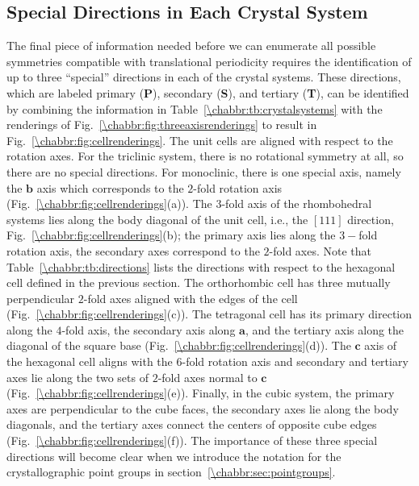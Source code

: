 \subsection{Special Directions in Each Crystal System}\label{\chabbr:ssec:specdir}

The final piece of information needed before we can enumerate all possible symmetries compatible with translational periodicity requires the identification of up to three ``special'' directions in each of the crystal systems.  These directions, which are labeled primary (\textbf{P}), secondary (\textbf{S}), and tertiary (\textbf{T}), can be identified by combining the information in Table~\ref{\chabbr:tb:crystalsystems} with the renderings of Fig.~\ref{\chabbr:fig:threeaxisrenderings} to result in Fig.~\ref{\chabbr:fig:cellrenderings}.  The unit cells are aligned with respect to the rotation axes. For the triclinic system, there is no rotational symmetry at all, so there are no special directions.  For monoclinic, there is one special axis, namely the $\mathbf{b}$ axis which corresponds to the $2$-fold rotation axis (Fig.~\ref{\chabbr:fig:cellrenderings}(a)).  The $3$-fold axis of the rhombohedral systems lies along the body diagonal of the unit cell, i.e., the $[111]$ direction, Fig.~\ref{\chabbr:fig:cellrenderings}(b); the primary axis lies along the $3-$fold rotation axis, the secondary axes correspond to the $2$-fold axes. Note that Table~\ref{\chabbr:tb:directions} lists the directions with respect to the hexagonal cell defined in the previous section. The orthorhombic cell has three mutually perpendicular $2$-fold axes aligned with the edges of the cell (Fig.~\ref{\chabbr:fig:cellrenderings}(c)). The tetragonal cell has its primary direction along the $4$-fold axis, the secondary axis along $\mathbf{a}$, and the tertiary axis along the diagonal of the square base (Fig.~\ref{\chabbr:fig:cellrenderings}(d)). The $\mathbf{c}$ axis of the hexagonal cell aligns with the $6$-fold rotation axis and secondary and tertiary axes lie along the two sets of $2$-fold axes normal to $\mathbf{c}$ (Fig.~\ref{\chabbr:fig:cellrenderings}(e)). Finally, in the cubic system, the primary axes are perpendicular to the cube faces, the secondary axes lie along the body diagonals, and the tertiary axes connect the centers of opposite cube edges (Fig.~\ref{\chabbr:fig:cellrenderings}(f)).  The importance of these three special directions will  become clear when we introduce the notation for the crystallographic point groups in section~\ref{\chabbr:sec:pointgroups}.

